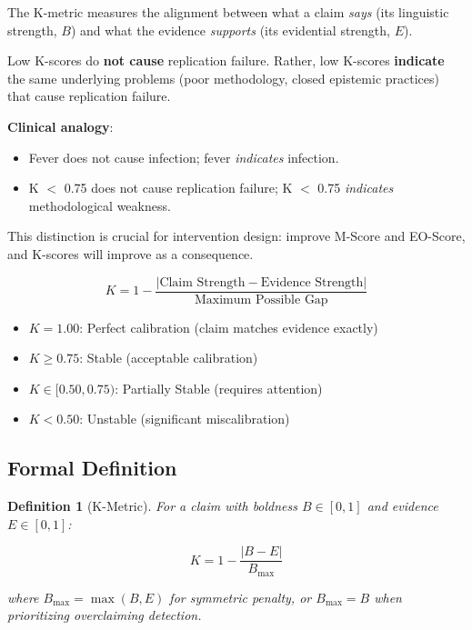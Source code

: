 \documentclass[11pt,a4paper]{article}
\newtheorem{definition}{Definition}[section]
\begin{document}
The K-metric measures the alignment between what a claim \textit{says} (its linguistic strength, $B$) and what the evidence \textit{supports} (its evidential strength, $E$).

\begin{warningbox}[title={ESL 2.3: K as Diagnostic, Not Causal}]
Low K-scores do \textbf{not cause} replication failure. Rather, low K-scores \textbf{indicate} the same underlying problems (poor methodology, closed epistemic practices) that cause replication failure.

\textbf{Clinical analogy}:
\begin{itemize}
    \item Fever does not cause infection; fever \textit{indicates} infection.
    \item K $<$ 0.75 does not cause replication failure; K $<$ 0.75 \textit{indicates} methodological weakness.
\end{itemize}

This distinction is crucial for intervention design: improve M-Score and EO-Score, and K-scores will improve as a consequence.
\end{warningbox}

\begin{definitionbox}[title={K-Metric Intuition}]
\begin{equation}
K = 1 - \frac{|\text{Claim Strength} - \text{Evidence Strength}|}{\text{Maximum Possible Gap}}
\end{equation}

\begin{itemize}
    \item $K = 1.00$: Perfect calibration (claim matches evidence exactly)
    \item $K \geq 0.75$: Stable (acceptable calibration)
    \item $K \in [0.50, 0.75)$: Partially Stable (requires attention)
    \item $K < 0.50$: Unstable (significant miscalibration)
\end{itemize}
\end{definitionbox}

\subsection{Formal Definition}

\begin{definition}[K-Metric]
\label{def:k-metric}
For a claim with boldness $B \in [0,1]$ and evidence $E \in [0,1]$:

\begin{equation}
K = 1 - \frac{|B - E|}{B_{\max}}
\end{equation}

where $B_{\max} = \max(B, E)$ for symmetric penalty, or $B_{\max} = B$ when prioritizing overclaiming detection.
\end{definition}
\end{document}
